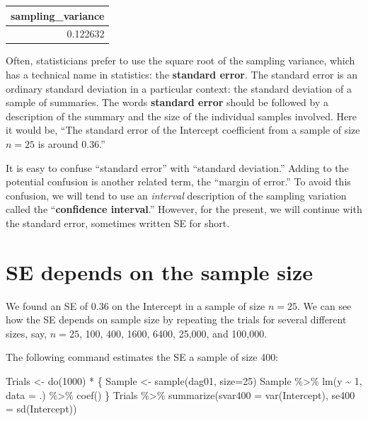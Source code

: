 \documentclass[
  letterpaper,
  DIV=11,
  numbers=noendperiod,
  oneside]{scrreprt}
\newenvironment{Shaded}{\begin{snugshade}}{\end{snugshade}}
\newcommand{\AttributeTok}[1]{\textcolor[rgb]{0.40,0.45,0.13}{#1}}
\newcommand{\DecValTok}[1]{\textcolor[rgb]{0.68,0.00,0.00}{#1}}
\newcommand{\FunctionTok}[1]{\textcolor[rgb]{0.28,0.35,0.67}{#1}}
\newcommand{\NormalTok}[1]{\textcolor[rgb]{0.00,0.23,0.31}{#1}}
\newcommand{\OtherTok}[1]{\textcolor[rgb]{0.00,0.23,0.31}{#1}}
\newcommand{\SpecialCharTok}[1]{\textcolor[rgb]{0.37,0.37,0.37}{#1}}
\begin{document}
\ttfamily 
\begin{tabular}{r}
\toprule
sampling\_variance\\
\midrule
0.122632\\
\bottomrule
\end{tabular} \normalfont
\bigskip

Often, statisticians prefer to use the square root of the sampling
variance, which has a technical name in statistics: the \textbf{standard
error}. The standard error is an ordinary standard deviation in a
particular context: the standard deviation of a sample of summaries. The
words \textbf{standard error} should be followed by a description of the
summary and the size of the individual samples involved. Here it would
be, ``The standard error of the Intercept coefficient from a sample of
size \(n=25\) is around 0.36.''

It is easy to confuse ``standard error'' with ``standard deviation.''
Adding to the potential confusion is another related term, the ``margin
of error.'' To avoid this confusion, we will tend to use an
\emph{interval} description of the sampling variation called the
``\textbf{confidence interval}.'' However, for the present, we will
continue with the standard error, sometimes written SE for short.

\hypertarget{se-depends-on-the-sample-size}{%
\section{SE depends on the sample
size}\label{se-depends-on-the-sample-size}}

We found an SE of 0.36 on the Intercept in a sample of size \(n=25\). We
can see how the SE depends on sample size by repeating the trials for
several different sizes, say, \(n=25\), 100, 400, 1600, 6400, 25,000,
and 100,000.

The following command estimates the SE a sample of size 400:

\begin{Shaded}
\begin{Highlighting}[]
\NormalTok{Trials }\OtherTok{\textless{}{-}} \FunctionTok{do}\NormalTok{(}\DecValTok{1000}\NormalTok{) }\SpecialCharTok{*}\NormalTok{ \{}
\NormalTok{  Sample }\OtherTok{\textless{}{-}} \FunctionTok{sample}\NormalTok{(dag01, }\AttributeTok{size=}\DecValTok{25}\NormalTok{) }
\NormalTok{  Sample }\SpecialCharTok{\%\textgreater{}\%} 
    \FunctionTok{lm}\NormalTok{(y }\SpecialCharTok{\textasciitilde{}} \DecValTok{1}\NormalTok{, }\AttributeTok{data =}\NormalTok{ .) }\SpecialCharTok{\%\textgreater{}\%}
    \FunctionTok{coef}\NormalTok{()}
\NormalTok{\}}
\NormalTok{Trials }\SpecialCharTok{\%\textgreater{}\%} \FunctionTok{summarize}\NormalTok{(}\AttributeTok{svar400 =} \FunctionTok{var}\NormalTok{(Intercept),}
                     \AttributeTok{se400 =} \FunctionTok{sd}\NormalTok{(Intercept))}
\end{Highlighting}
\end{Shaded}
\end{document}
